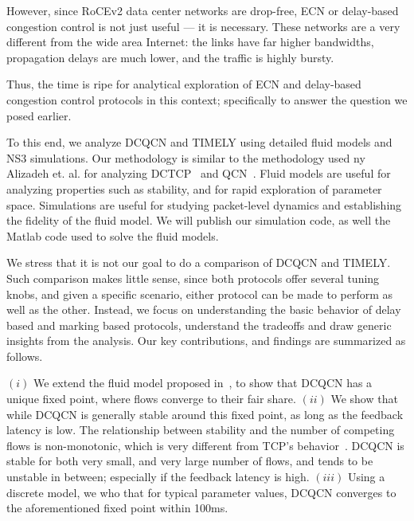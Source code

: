 However, since RoCEv2 data center networks are drop-free, ECN or
delay-based congestion control is not just useful --- it is necessary. These
networks are a very different from the wide area Internet: the links have far
higher bandwidths, propagation delays are much lower, and the traffic is highly
bursty. 

Thus, the time is ripe for analytical exploration of ECN and delay-based
congestion control protocols in this context; specifically to answer the
question we posed earlier.


To this end, we analyze DCQCN and TIMELY using detailed fluid models and NS3
simulations. Our methodology is similar to the methodology used ny Alizadeh et.
al. for analyzing DCTCP~\cite{dctcp-analysis} and QCN~\cite{qcn-analysis}. Fluid
models are useful for analyzing properties such as stability, and for rapid
exploration of parameter space.  Simulations are useful for studying
packet-level dynamics and establishing the fidelity of the fluid model.  We will
publish our simulation code, as well the Matlab code used to solve the fluid
models.


We stress that it is not our goal to do a comparison of DCQCN and
TIMELY.  Such comparison makes little sense, since both protocols offer several
tuning knobs, and given a specific scenario, either protocol can be made to
perform as well as the other. Instead, we focus on understanding the basic
behavior of delay based and marking based protocols, understand the
tradeoffs and draw generic insights from the analysis.
Our key contributions, and findings are summarized as follows.

 $(i)$ We extend the fluid model proposed in~\cite{dcqcn}, to
show that DCQCN has a unique fixed point, where flows converge to their fair
share. $(ii)$ We show that while DCQCN is generally stable around this
fixed point, as long as the feedback latency is low. The relationship between
stability and the number of competing flows is non-monotonic, which is very
different from TCP's behavior~\cite{misra:TAC2002}. DCQCN is stable for both
very small, and very large number of flows, and tends to be unstable in between;
especially if the feedback latency is high.  $(iii)$ Using a discrete model, we
who that for typical parameter values, DCQCN converges to the aforementioned
fixed point within 100ms.

